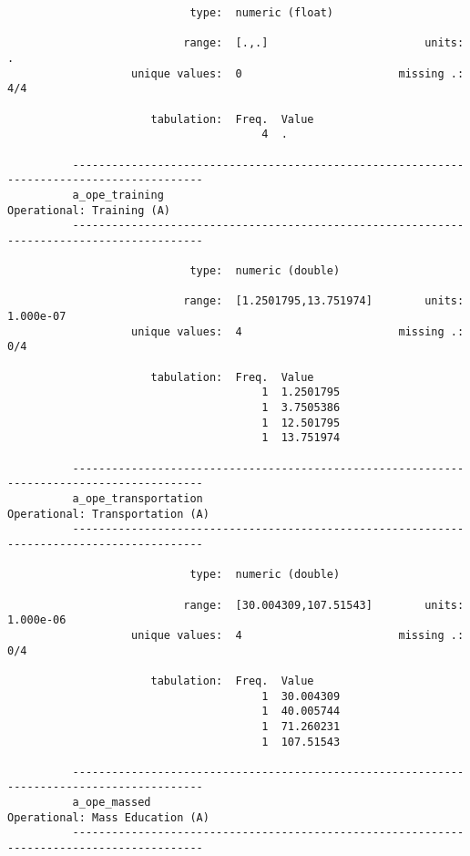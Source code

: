 \documentclass{article}
\begin{document}
\begin{verbatim}
                            type:  numeric (float)
          
                           range:  [.,.]                        units:  .
                   unique values:  0                        missing .:  4/4
          
                      tabulation:  Freq.  Value
                                       4  .
          
          ------------------------------------------------------------------------------------------
          a_ope_training                                                   Operational: Training (A)
          ------------------------------------------------------------------------------------------
          
                            type:  numeric (double)
          
                           range:  [1.2501795,13.751974]        units:  1.000e-07
                   unique values:  4                        missing .:  0/4
          
                      tabulation:  Freq.  Value
                                       1  1.2501795
                                       1  3.7505386
                                       1  12.501795
                                       1  13.751974
          
          ------------------------------------------------------------------------------------------
          a_ope_transportation                                       Operational: Transportation (A)
          ------------------------------------------------------------------------------------------
          
                            type:  numeric (double)
          
                           range:  [30.004309,107.51543]        units:  1.000e-06
                   unique values:  4                        missing .:  0/4
          
                      tabulation:  Freq.  Value
                                       1  30.004309
                                       1  40.005744
                                       1  71.260231
                                       1  107.51543
          
          ------------------------------------------------------------------------------------------
          a_ope_massed                                               Operational: Mass Education (A)
          ------------------------------------------------------------------------------------------
          

\end{verbatim}
\end{document}
